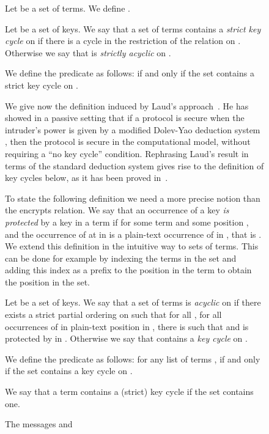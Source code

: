 \documentclass[acmtocl,acmnow]{acmtrans2m}
\newcommand{\sacyclic}{strictly acyclic}
\begin{document}
\begin{figure}[t]
{{Let  be a set of terms. We define .

\begin{definition}\label{def:skc}
Let  be a set of keys. We say that a set of terms  contains a \emph{strict key
cycle} on  if there is a cycle in the restriction of the relation  on . Otherwise we say that
 is \emph{\sacyclic} on .

We define the predicate  as follows:
 if and only if
the set  contains a strict key cycle on .
\end{definition}




We give now the definition induced by Laud's approach~\cite{Laud-NORDSEC02}. He has showed in a passive
setting that if a protocol is secure when the intruder's power is given by a modified Dolev-Yao deduction
system , then the protocol is secure in the computational model, without requiring a ``no
key cycle'' condition. Rephrasing Laud's result in terms of the standard deduction system  gives rise
to the definition of key cycles below, as it has been proved in~\cite{Janvier-these}.

To state the following definition we need a more precise notion than the encrypts relation. We say that
an occurrence  of a key  \emph{is protected} by a key  in a term 
if  for some term  and some position , and the occurrence of  at  in
 is a plain-text
occurrence of  in , that is . We extend this definition in the intuitive way to sets of terms. This can be done for example
by indexing the terms in the set and adding this index as a prefix to the position in the term to
obtain the position in the set.




\begin{definition}\label{def:kc}Let  be a set of keys. We say that a set of terms  is \emph{acyclic} on  if there
exists a strict partial ordering
 on  such that for all , for all occurrences  of  in plain-text position in , there
is  such that  and  is protected by  in . Otherwise we say that  contains a \emph{key cycle} on .

We define the predicate  as follows: for any list of terms ,
 if and only if
the set  contains a key cycle on .
\end{definition}

We say that a term  contains a (strict) key cycle if the set  contains one.

\begin{example}
The messages  and
  

\end{example}}}
\end{figure}
\end{document}
